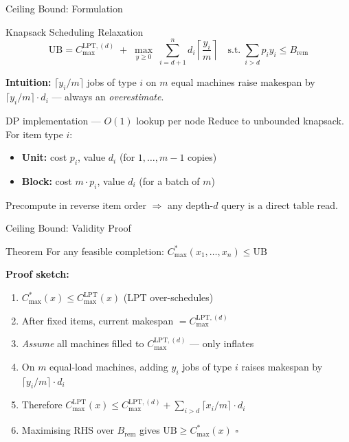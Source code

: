 \documentclass[fleqn,11pt,aspectratio=43]{beamer}
\newcommand{\Copt}{C_{\max}^{*}}
\newcommand{\Clpt}{C_{\max}^{\mathrm{LPT}}}
\newcommand{\Brem}{B_{\mathrm{rem}}}
\newcommand{\UB}{\mathrm{UB}}
\begin{document}
\begin{frame}[shrink=5]{Ceiling Bound: Formulation}
  \begin{block}{Knapsack Scheduling Relaxation}
    \vspace{-0.3em}
    \[\UB = C_{\max}^{\mathrm{LPT},(d)}
      \;+\;
      \max_{y\geq 0}\;\sum_{i=d+1}^{n}d_i\!\left\lceil\frac{y_i}{m}\right\rceil
      \quad\text{s.t.}\;\sum_{i>d}p_iy_i\leq\Brem\]
    \vspace{-0.3em}
  \end{block}
  \textbf{Intuition:} $\lceil y_i/m\rceil$ jobs of type $i$ on $m$ equal machines raise makespan by
  $\lceil y_i/m\rceil\cdot d_i$ — always an \emph{overestimate}.
  \begin{block}{DP implementation — $O(1)$ lookup per node}
    \small Reduce to unbounded knapsack. For item type $i$:
    \begin{itemize}\small
      \item \textbf{Unit:} cost $p_i$, value $d_i$ (for $1,\ldots,m{-}1$ copies)
      \item \textbf{Block:} cost $m\cdot p_i$, value $d_i$ (for a batch of $m$)
    \end{itemize}
    Precompute in reverse item order $\Rightarrow$ any depth-$d$ query is a direct table read.
  \end{block}
\end{frame}

\begin{frame}[shrink=8]{Ceiling Bound: Validity Proof}
  \begin{block}{Theorem}
    For any feasible completion: $\Copt(x_1,\ldots,x_n)\leq\UB$
  \end{block}
  \textbf{Proof sketch:}
  \begin{enumerate}
    \item $\Copt(x)\leq\Clpt(x)$ (LPT over-schedules)
    \item After fixed items, current makespan $= C_{\max}^{\mathrm{LPT},(d)}$
    \item \emph{Assume} all machines filled to $C_{\max}^{\mathrm{LPT},(d)}$ — only inflates
    \item On $m$ equal-load machines, adding $y_i$ jobs of type $i$ raises makespan by
          $\lceil y_i/m\rceil\cdot d_i$
    \item Therefore $\Clpt(x)\leq C_{\max}^{\mathrm{LPT},(d)}+\sum_{i>d}\lceil x_i/m\rceil\cdot d_i$
    \item Maximising RHS over $\Brem$ gives $\UB\geq\Copt(x)$ \hfill$\square$
  \end{enumerate}
\end{frame}
\end{document}
